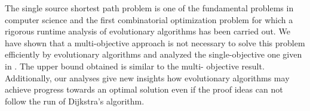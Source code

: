 \documentclass{sig-alternate}
\begin{document}
The single source shortest path problem is one of the fundamental problems in 
computer science and the first combinatorial optimization problem for which a 
rigorous runtime analysis of evolutionary algorithms has been carried out. We 
have shown that a multi-objective approach is not necessary to solve this 
problem efficiently by evolutionary algorithms and analyzed the single-objective 
one given in \cite{spea04}. The upper bound obtained is similar to the multi-
objective result. Additionally, our analyses give new insights how evolutionary 
algorithms may achieve progress towards an optimal solution even if the proof 
ideas can not follow the run of Dijkstra's algorithm.


\end{document}
